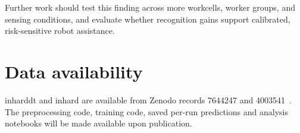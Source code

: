 \documentclass[3p,times,procedia]{elsarticle}
\begin{document}
Further work
should test this finding across more workcells, worker groups, and sensing
conditions, and evaluate whether recognition gains support calibrated,
risk-sensitive robot assistance.

\section*{Data availability}

\ac{inharddt} and \ac{inhard} are available from Zenodo records 7644247 and
4003541~\cite{dallel2023dataset,dallel2020inhard}. The preprocessing code,
training code, saved per-run predictions and analysis notebooks will be made
available upon publication.

\newpage


\end{document}
